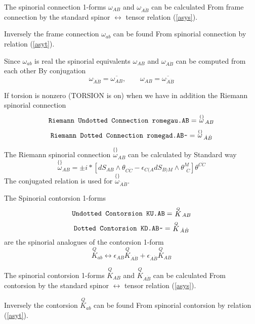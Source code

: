 \documentclass[twoside,openright]{report}
\newcommand{\grgtt}{\ttfamily}
\newcommand{\rim}[1]{\stackrel{\scriptscriptstyle\{\}}{#1}\!}
\newcommand{\object}[2]{%
\begin{equation}
\mbox{\comm{#1}} =\ #2
\end{equation}}
\newcommand{\tsst}{\longleftrightarrow}
\renewcommand{\tt}{\grgtt}
\newcommand{\cc}{{\tt \char'176}}           %
\newcommand{\comm}[1]{{\upshape\tt#1}}    %
\begin{document}
The spinorial connection 1-forms
$\omega_{AB}$ and $\omega_{\dot A\dot B}$
can be calculated {\tt From frame connection} by the
standard spinor $\tsst$ tensor relation (\ref{asys}).

Inversely the frame connection $\omega_{ab}$ can be
found {\tt From spinorial connection} by relation (\ref{asyt}).

Since $\omega_{ab}$ is real the spinorial equivalents
$\omega_{AB}$ and $\omega_{\dot A\dot B}$ can be computed from
each other {\tt By conjugation}
\begin{equation}
\omega_{\dot A\dot B}=\overline{\omega_{AB}},\qquad
\omega_{AB}=\overline{\omega_{\dot A\dot B}}
\end{equation}

If torsion is nonzero (\comm{TORSION} is on) when we have
in addition the {\tt Riemann spinorial connection}
\object{Riemann Undotted Connection romegau.AB}{\rim{\omega}_{AB}}
\object{Riemann Dotted Connection romegad.AB\cc}{\rim{\omega}_{\dot A\dot B}}

The Riemann spinorial connection $\rim{\omega}_{AB}$
can be calculated by {\tt Standard way}
\begin{equation}
\stackrel{{\scriptscriptstyle\{\}}}{\omega}_{AB}= \label{ssolver}
\pm i*[ d  S_{AB}\wedge\theta_{C\dot C}
   -\epsilon_{C(A} d  S_{B)M}\wedge \theta^M_{\ \ \dot C}]\theta^{C\dot C}
\end{equation}
The conjugated relation is used for $\rim{\omega}_{\dot A\dot B}$.

The {\tt Spinorial contorsion} 1-forms
\object{Undotted Contorsion KU.AB}{\stackrel{\scriptscriptstyle Q}{K}\!{}_{AB}}
\object{Dotted Contorsion KD.AB\cc}{\stackrel{\scriptscriptstyle Q}{K}\!{}_{\dot A\dot B}}
are the spinorial analogues of the contorsion 1-form
\begin{equation}
\stackrel{\scriptscriptstyle Q}{K}_{ab} \tsst
\epsilon_{AB} \stackrel{\scriptscriptstyle Q}{K}_{\dot A\dot B}
+ \epsilon_{\dot A\dot B} \stackrel{\scriptscriptstyle Q}{K}_{AB}
\end{equation}

The spinorial contorsion 1-forms
$\stackrel{\scriptscriptstyle Q}{K}_{AB}$ and $\stackrel{\scriptscriptstyle Q}{K}_{\dot A\dot B}$
can be calculated {\tt From contorsion} by the
standard spinor $\tsst$ tensor relation (\ref{asys}).

Inversely the contorsion $\stackrel{\scriptscriptstyle Q}{K}_{ab}$ can be
found {\tt From spinorial contorsion} by relation (\ref{asyt}).
\end{document}
